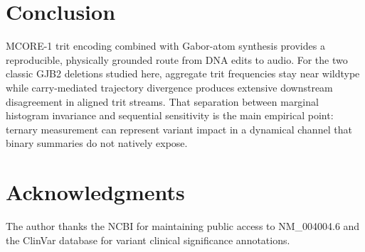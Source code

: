 \documentclass[preprint,12pt]{elsarticle}
\begin{document}
\section{Conclusion}

MCORE-1 trit encoding combined with Gabor-atom synthesis provides a reproducible, physically grounded route from DNA edits to audio. For the two classic GJB2 deletions studied here, aggregate trit frequencies stay near wildtype while carry-mediated trajectory divergence produces extensive downstream disagreement in aligned trit streams. That separation between marginal histogram invariance and sequential sensitivity is the main empirical point: ternary measurement can represent variant impact in a dynamical channel that binary summaries do not natively expose.

\section*{Acknowledgments}
The author thanks the NCBI for maintaining public access to NM\_004004.6 and the ClinVar database for variant clinical significance annotations.



\end{document}
